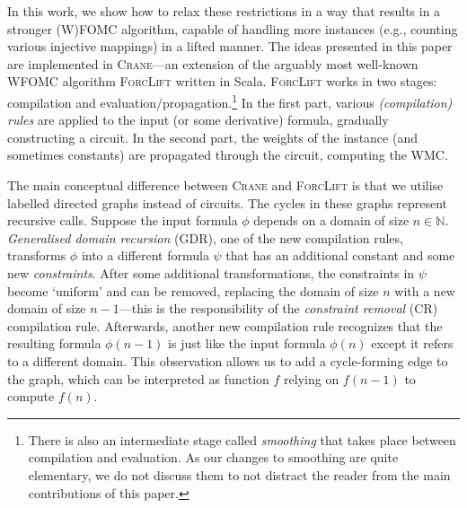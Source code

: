 \documentclass[letterpaper]{article} %
\theoremstyle{definition}
\begin{document}


In this work, we show how to relax these restrictions in a way that results in a
stronger (W)FOMC algorithm, capable of handling more instances (e.g., counting
various injective mappings) in a lifted manner. The ideas presented in this
paper are implemented in \textsc{Crane}---an extension of the arguably most
well-known WFOMC algorithm \textsc{ForcLift} written in Scala. \textsc{ForcLift}
works in two stages: compilation and evaluation/propagation.\footnote{There is
  also an intermediate stage called \emph{smoothing} that takes place between
  compilation and evaluation. As our changes to smoothing are quite elementary,
  we do not discuss them to not distract the reader from the main contributions
  of this paper.} In the first part, various \emph{(compilation) rules} are
applied to the input (or some derivative) formula, gradually constructing a
circuit. In the second part, the weights of the instance (and sometimes
constants) are propagated through the circuit, computing the WMC\@.


The main conceptual difference between \textsc{Crane} and \textsc{ForcLift} is
that we utilise labelled directed graphs instead of circuits. The cycles in
these graphs represent recursive calls. Suppose the input formula $\phi$ depends
on a domain of size $n \in \mathbb{N}$. \emph{Generalised domain recursion}
(GDR), one of the new compilation rules, transforms $\phi$ into a different
formula $\psi$ that has an additional constant and some new \emph{constraints}.
After some additional transformations, the constraints in $\psi$ become
`uniform' and can be removed, replacing the domain of size $n$ with a new domain
of size $n-1$---this is the responsibility of the \emph{constraint removal} (CR)
compilation rule. Afterwards, another new compilation rule recognizes that the
resulting formula $\phi(n-1)$ is just like the input formula $\phi(n)$ except it
refers to a different domain. This observation allows us to add a cycle-forming
edge to the graph, which can be interpreted as function $f$ relying on $f(n-1)$
to compute $f(n)$.

\end{document}

